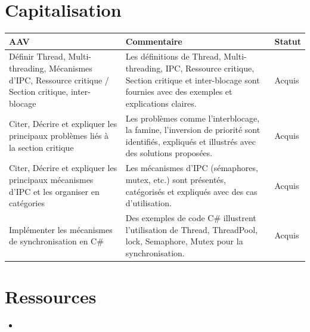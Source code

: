 \newpage

\section*{Capitalisation}

\begin{center}
\setlength{\tabcolsep}{10pt}

\begin{tabular}{|p{}|p{}|m{}|}
\hline
\textbf{AAV} & \textbf{Commentaire} & \textbf{Statut} \\ \hline

Définir Thread, Multi-threading, Mécanismes d'IPC, Ressource critique / Section critique, inter-blocage &
Les définitions de Thread, Multi-threading, IPC, Ressource critique, Section critique et inter-blocage sont fournies avec des exemples et explications claires. &
{\color{green!60!black}Acquis} \\ \hline

Citer, Décrire et expliquer les principaux problèmes liés à la section critique &
Les problèmes comme l'interblocage, la famine, l'inversion de priorité sont identifiés, expliqués et illustrés avec des solutions proposées. &
{\color{green!60!black}Acquis} \\ \hline

Citer, Décrire et expliquer les principaux mécanismes d'IPC et les organiser en catégories &
Les mécanismes d'IPC (sémaphores, mutex, etc.) sont présentés, catégorisés et expliqués avec des cas d'utilisation. &
{\color{green!60!black}Acquis} \\ \hline

Implémenter les mécanismes de synchronisation en C\# &
Des exemples de code C\# illustrent l'utilisation de Thread, ThreadPool, lock, Semaphore, Mutex pour la synchronisation. &
{\color{green!60!black}Acquis} \\ \hline

\end{tabular}
\end{center}

\newpage

\section*{Ressources}

\begin{itemize}
	\item 
\end{itemize}
